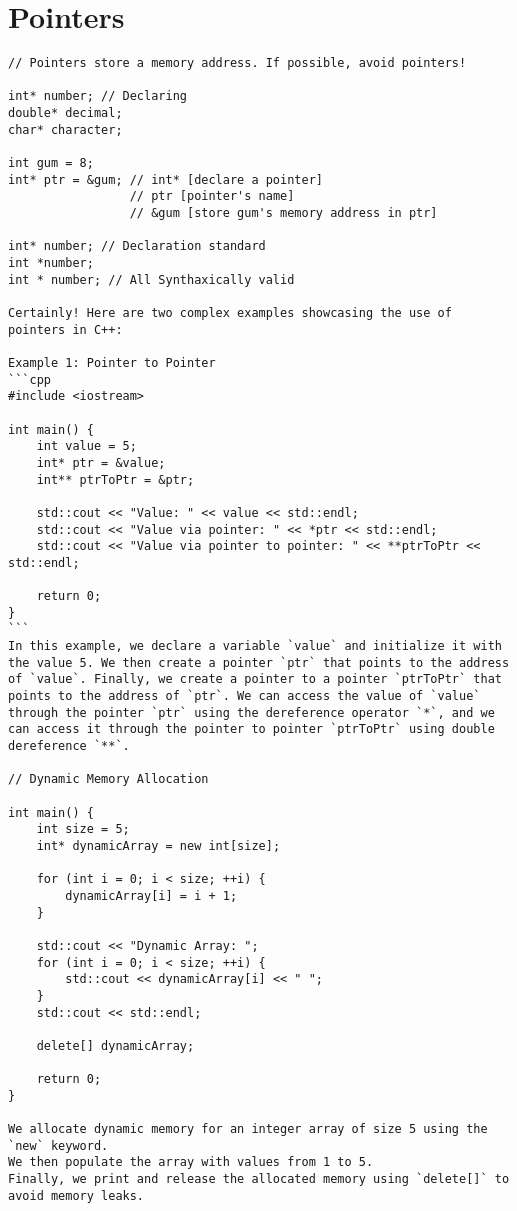 \section{Pointers}

\begin{verbatim}
// Pointers store a memory address. If possible, avoid pointers!

int* number; // Declaring
double* decimal;
char* character;

int gum = 8;
int* ptr = &gum; // int* [declare a pointer]
                 // ptr [pointer's name]
                 // &gum [store gum's memory address in ptr]

int* number; // Declaration standard
int *number;
int * number; // All Synthaxically valid

Certainly! Here are two complex examples showcasing the use of pointers in C++:

Example 1: Pointer to Pointer
```cpp
#include <iostream>

int main() {
    int value = 5;
    int* ptr = &value;
    int** ptrToPtr = &ptr;

    std::cout << "Value: " << value << std::endl;
    std::cout << "Value via pointer: " << *ptr << std::endl;
    std::cout << "Value via pointer to pointer: " << **ptrToPtr << std::endl;

    return 0;
}
```
In this example, we declare a variable `value` and initialize it with the value 5. We then create a pointer `ptr` that points to the address of `value`. Finally, we create a pointer to a pointer `ptrToPtr` that points to the address of `ptr`. We can access the value of `value` through the pointer `ptr` using the dereference operator `*`, and we can access it through the pointer to pointer `ptrToPtr` using double dereference `**`.

// Dynamic Memory Allocation

int main() {
    int size = 5;
    int* dynamicArray = new int[size];

    for (int i = 0; i < size; ++i) {
        dynamicArray[i] = i + 1;
    }

    std::cout << "Dynamic Array: ";
    for (int i = 0; i < size; ++i) {
        std::cout << dynamicArray[i] << " ";
    }
    std::cout << std::endl;

    delete[] dynamicArray;

    return 0;
}

We allocate dynamic memory for an integer array of size 5 using the `new` keyword.
We then populate the array with values from 1 to 5.
Finally, we print and release the allocated memory using `delete[]` to avoid memory leaks.
\end{verbatim}

